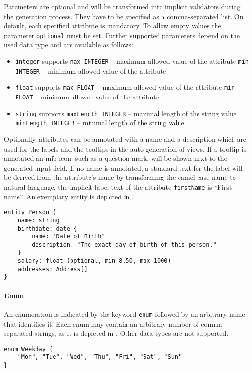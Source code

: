 Parameters are optional and will be transformed into implicit validators during the generation process. They have to be specified as a comma-separated list. On default, each specified attribute is mandatory. To allow empty values the parameter \lstinline!optional! must be set. Further supported parameters depend on the used data type and are available as follows:

\begin{itemize}
\item \lstinline!integer! supports
\subitem \lstinline!max INTEGER! – maximum allowed value of the attribute
\subitem \lstinline!min INTEGER! – minimum allowed value of the attribute
\item \lstinline!float! supports
\subitem \lstinline!max FLOAT! – maximum allowed value of the attribute
\subitem \lstinline!min FLOAT! – minimum allowed value of the attribute
\item \lstinline!string! supports
\subitem \lstinline!maxLength INTEGER! – maximal length of the string value
\subitem \lstinline!minLength INTEGER! – minimal length of the string value
\end{itemize}

Optionally, attributes can be annotated with a name and a description which are used for the labels and the tooltips in the auto-generation of views. If a tooltip is annotated an info icon, such as a question mark, will be shown next to the generated input field. If no name is annotated, a standard text for the label will be derived from the attribute's name by transforming the camel case name to natural language, \eg the implicit label text of the attribute \lstinline|firstName| is \enquote{First name}. An exemplary entity is depicted in .

\begin{lstlisting}[language=MD2, label=lst:personexample, caption=Exemplary entity that represents a person]
entity Person {
	name: string
	birthdate: date {
		name: "Date of Birth"
		description: "The exact day of birth of this person."
	}
	salary: float (optional, min 8.50, max 1000)
	addresses: Address[]
}
\end{lstlisting}

\paragraph{Enum}
An enumeration is indicated by the keyword \lstinline!enum! followed by an arbitrary name that identifies it. Each enum may contain an arbitrary number of comma-separated strings, as it is depicted in . Other data types are not supported.

\begin{lstlisting}[language=MD2, label=lst:enumexample, caption=Exemplary enum element to specify weekdays]
enum Weekday {
	"Mon", "Tue", "Wed", "Thu", "Fri", "Sat", "Sun"
}
\end{lstlisting}